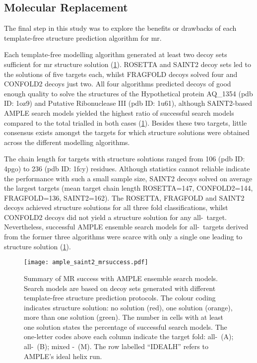 \subsection{Molecular Replacement}
The final step in this study was to explore the benefits or drawbacks of each template-free structure prediction algorithm for \gls{mr}.

Each template-free modelling algorithm generated at least two decoy sets sufficient for \gls{mr} structure solution (\cref{fig:ample_saint2_mrsuccess}). ROSETTA and SAINT2 decoy sets led to the solutions of five targets each, whilst FRAGFOLD decoys solved four and CONFOLD2 decoys just two. All four algorithms predicted decoys of good enough quality to solve the structures of the Hypothetical protein AQ\_1354 (\gls{pdb} ID: 1oz9) and Putative Ribonuclease III (\gls{pdb} ID: 1u61), although SAINT2-based AMPLE search models yielded the highest ratio of successful search models compared to the total trialled in both cases (\cref{fig:ample_saint2_mrsuccess}). Besides these two targets, little consensus exists amongst the targets for which structure solutions were obtained across the different modelling algorithms.

The chain length for targets with structure solutions ranged from 106 (\gls{pdb} ID: 4pgo) to 236 (\gls{pdb} ID: 1fcy) residues. Although statistics cannot reliable indicate the performance with such a small sample size, SAINT2 decoys solved on average the largest targets (mean target chain length ROSETTA=147, CONFOLD2=144, FRAGFOLD=136,  SAINT2=162). The ROSETTA, FRAGFOLD and SAINT2 decoys achieved structure solutions for all three fold classifications, whilst CONFOLD2 decoys did not yield a structure solution for any all-\textbeta\ target. Nevertheless, successful AMPLE ensemble search models for all-\textbeta\ targets derived from the former three algorithms were scarce with only a single one leading to structure solution (\cref{fig:ample_saint2_mrsuccess}).

\begin{figure}[H]
    \centering
    \texttt{[image: ample\_saint2\_mrsuccess.pdf]}
    \caption[Summary of MR success with AMPLE ensemble search models]{Summary of MR success with AMPLE ensemble search models. Search models are based on decoy sets generated with different template-free structure prediction protocols. The colour coding indicates structure solution: no solution (red), one solution (orange), more than one solution (green). The number in cells with at least one solution states the percentage of successful search models. The one-letter codes above each column indicate the target fold: all-\textalpha\ (A); all-\textbeta\ (B); mixed \textalpha-\textbeta\ (M). The row labelled ``IDEALH'' refers to AMPLE's ideal helix run.}
    \label{fig:ample_saint2_mrsuccess}
\end{figure}

